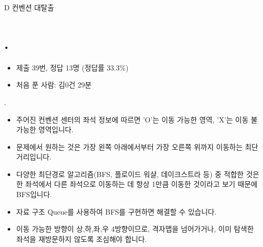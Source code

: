 
\setproblem
    {D}
    {컨벤션 대탈출}

\section{\pletter. \ptitle}

\begin{frame}[label=problem-D] %
    \sectiontitle{\pletter}{\ptitle}
    \begin{itemize}
        \item 제출 39번, 정답 13명 (정답률 33.3\%)
        \item 처음 푼 사람: 김0건 29분
    \end{itemize}
\end{frame}
\begin{frame}{\textbf{\pletter}. \ptitle}
    \begin{itemize}
        \item 주어진 컨벤션 센터의 좌석 정보에 따르면 'O'는 이동 가능한 영역, 'X'는 이동 불가능한 영역입니다.
        \item 문제에서 원하는 것은 가장 왼쪽 아래에서부터 가장 오른쪽 위까지 이동하는 최단 거리입니다.
        \item 다양한 최단경로 알고리즘(BFS, 플로이드 워샬, 데이크스트라 등) 중 적합한 것은
        한 좌석에서 다른 좌석으로 이동하는 데 항상 1만큼 이동한 것이라고 보기 때문에 BFS입니다.\\
        \item 자료 구조 Queue를 사용하여 BFS를 구현하면 해결할 수 있습니다.
        \item 이동 가능한 방향이 상,하,좌,우 4방향이므로, 격자맵을 넘어가거나,
        이미 탐색한 좌석을 재방문하지 않도록 조심해야 합니다.

    \end{itemize}
\end{frame}

